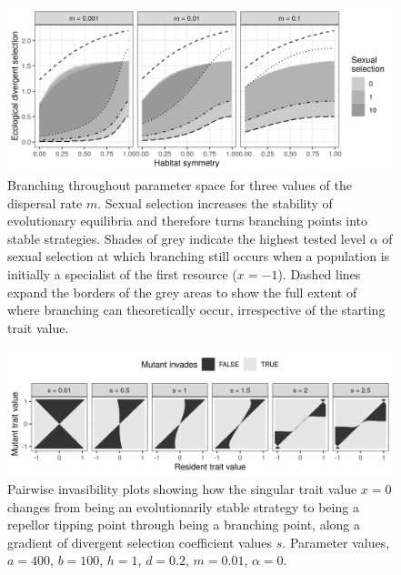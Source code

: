 \begin{figure}
    \centering
    \includegraphics[width=\textwidth]{figures/map_branching_points}
    \caption{Branching throughout parameter space for three values of the dispersal rate $m$. Sexual selection increases the stability of evolutionary equilibria and therefore turns branching points into stable strategies. Shades of grey indicate the highest tested level $\alpha$ of sexual selection at which branching still occurs when a population is initially a specialist of the first resource ($x = -1$). Dashed lines expand the borders of the grey areas to show the full extent of where branching can theoretically occur, irrespective of the starting trait value.}
    \label{fig:map_branching_points}
\end{figure}

\begin{figure}
    \centering
    \includegraphics[width=\textwidth]{figures/pairwise_invasibility_plots}
    \caption{Pairwise invasibility plots showing how the singular trait value $x = 0$ changes from being an evolutionarily stable strategy to being a repellor tipping point through being a branching point, along a gradient of divergent selection coefficient values $s$. Parameter values, $a = 400$, $b = 100$, $h = 1$, $d = 0.2$, $m = 0.01$, $\alpha = 0$.}
    \label{fig:pairwise_invasibility}
\end{figure}

